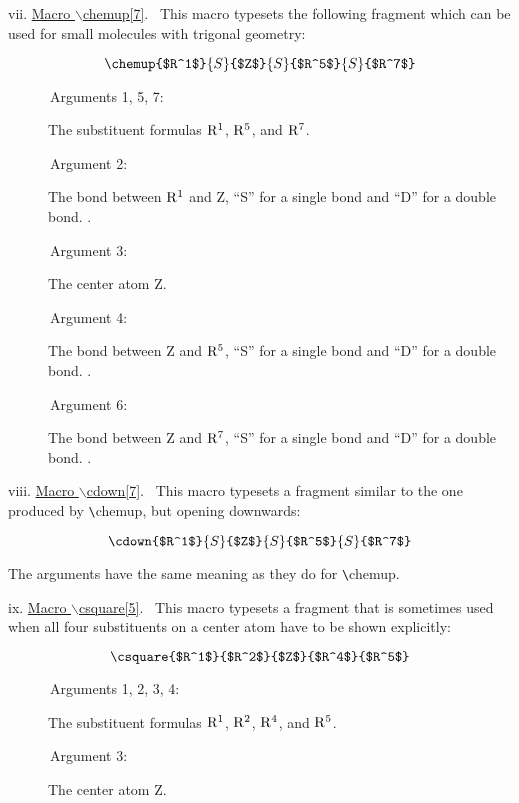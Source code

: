  \vspace{\len mm}
 \newpage
 \indent vii. \underline{Macro $\backslash $chemup[7]}.
 \ This macro typesets the following fragment which can
 be used for small molecules with trigonal geometry:

 \[ \chemup{$R^1$}{S}{$Z$}{S}{$R^5$}{S}{$R^7$}  \]

 \begin{description}
 \item[{\rm \ \ \ \ \ \ Arguments 1, 5, 7:}] The substituent formulas
      ${\rm R^1}$, ${\rm R^5}$, and ${\rm R^7}$.
 \item[{\rm \ \ \ \ \ \ Argument 2:}] The bond between ${\rm R^1}$ and
      Z, ``S'' for a single bond and ``D'' for a double bond. \ri .
 \item[{\rm \ \ \ \ \ \ Argument 3:}] The center atom Z.
 \item[{\rm \ \ \ \ \ \ Argument 4:}] The bond between Z and ${\rm R^5}$,
      ``S'' for a single bond and ``D'' for a double bond. \ri .
 \item[{\rm \ \ \ \ \ \ Argument 6:}] The bond between Z and ${\rm R^7}$,
      ``S'' for a single bond and ``D'' for a double bond. \ri .
 \end{description}

 \vspace{\len mm}
 \indent viii. \underline{Macro $\backslash $cdown[7]}.
  \ This macro typesets a fragment similar to the one produced
 by \verb+\+chemup, but opening downwards:

 \[ \cdown{$R^1$}{S}{$Z$}{S}{$R^5$}{S}{$R^7$}   \]

 The arguments have the same meaning as they do for \verb+\+chemup.

 \vspace{\len mm}
 \newpage
 \indent ix. \underline{Macro $\backslash $csquare[5]}.
 \ This macro typesets a fragment that is sometimes used when all
 four substituents on a center atom have to be shown explicitly:

 \[ \csquare{$R^1$}{$R^2$}{$Z$}{$R^4$}{$R^5$}  \]

 \begin{description}
 \item[{\rm \ \ \ \ \ \ Arguments 1, 2, 3, 4:}] The substituent formulas
      ${\rm R^1}$, ${\rm R^2}$, ${\rm R^4}$, and ${\rm R^5}$.
 \item[{\rm \ \ \ \ \ \ Argument 3:}] The center atom Z.
 \end{description}  
   
